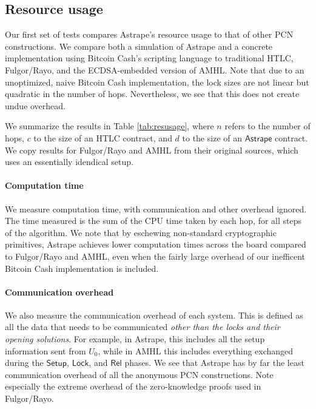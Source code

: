 \documentclass[USenglish,oneside,twocolumn]{article}
\begin{document}
\subsection{Resource usage}

Our first set of tests compares Astrape's resource usage to that of other PCN constructions. We compare both a simulation of Astrape and a concrete implementation using Bitcoin Cash's scripting language to traditional HTLC, Fulgor/Rayo, and the ECDSA-embedded version of AMHL. Note that due to an unoptimized, naive Bitcoin Cash implementation, the lock sizes are not linear but quadratic in the number of hops. Nevertheless, we see that this does not create undue overhead.

We summarize the results in Table \ref{tab:resusage}, where $n$ refers to the number of hops, $c$ to the size of an HTLC contract, and $d$ to the size of an $\mathsf{Astrape}$ contract. We copy results for Fulgor/Rayo \cite{malavolta2017concurrency} and AMHL \cite{malavolta2019anonymous} from their original sources, which uses an essentially idendical setup.

\paragraph*{Computation time}

We measure computation time, with communication and other overhead ignored. The time measured is the sum of the CPU time taken by each hop, for all steps of the algorithm. We note that by eschewing non-standard cryptographic primitives, Astrape achieves lower computation times across the board compared to Fulgor/Rayo and AMHL, even when the fairly large overhead of our inefficent Bitcoin Cash implementation is included.

\paragraph*{Communication overhead}

We also measure the communication overhead of each system. This is defined as all the data that needs to be communicated \emph{other than the locks and their opening solutions}. For example, in Astrape, this includes all the setup information sent from $U_0$, while in AMHL this includes everything exchanged during the $\mathsf{Setup}$, $\mathsf{Lock}$, and $\mathsf{Rel}$ \cite{malavolta2019anonymous} phases. We see that Astrape has by far the least communication overhead of all the anonymous PCN constructions. Note especially the extreme overhead of the zero-knowledge proofs used in Fulgor/Rayo.
\end{document}
